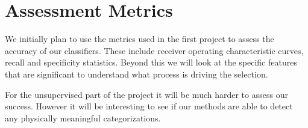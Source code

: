 \section{Assessment Metrics}
We initially plan to use the metrics used in the first project to assess the accuracy of our classifiers. These include receiver operating characteristic  curves, recall and specificity statistics. Beyond this we will look at the specific features that are significant to understand what process is driving the selection.

For the unsupervised part of the project it will be much harder to assess our success. However it will be interesting to see if our methods are able to detect any physically meaningful categorizations.